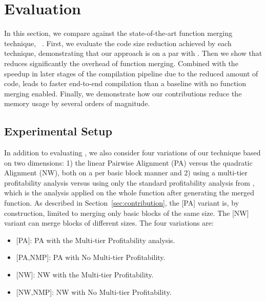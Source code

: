 \section{Evaluation}
\label{sec:evaluation}

In this section, we compare {\ProjName} against the state-of-the-art function merging technique, {\SOAName}~\cite{rocha20}.
First, we evaluate the code size reduction achieved by each technique, demonstrating that our approach is on a par with {\SOAName}. Then we show that {\ProjName} reduces significantly the overhead of function merging. %
Combined with the speedup in later stages of the compilation pipeline due to the reduced amount of code, {\ProjName} leads to faster end-to-end compilation than a baseline with no function merging enabled. Finally, we demonstrate how our contributions reduce the memory usage by several orders of magnitude. 

\subsection{Experimental Setup}
In addition to evaluating \SOAName, we also consider four variations of our technique based on two dimensions:
1) the linear Pairwise Alignment (PA) versus the quadratic {\NW} Alignment (NW), both on a per basic block manner and
2) using a multi-tier profitability analysis versus using only the standard profitability analysis from {\SOAName}, which is the analysis applied on the whole function after generating the merged function.
As described in Section~\ref{sec:contribution}, the [PA] variant is, by construction, limited to merging only basic blocks of the same size. The [NW] variant can merge blocks of different sizes. The four variations are:

\begin{itemize}
    \item {[PA]}: PA with the Multi-tier Profitability analysis.
    \item {[PA,NMP]}: PA with No Multi-tier Profitability.
    \item {[NW]}: NW with the Multi-tier Profitability.
    \item {[NW,NMP]}: NW with No Multi-tier Profitability.
\end{itemize}

